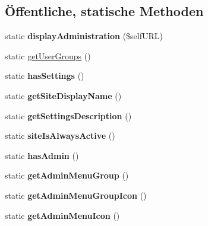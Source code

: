 \subsection*{Öffentliche, statische Methoden}
\begin{DoxyCompactItemize}
\item 
\mbox{\label{classadministrationusersync_a6d9513d9db627bb09eb7218b7edb7eb5}} 
static {\bfseries display\+Administration} (\$self\+U\+RL)
\item 
static \mbox{\hyperlink{classadministrationusersync_a017621e1115c3d33fb2b433400b42375}{get\+User\+Groups}} ()
\item 
\mbox{\label{classadministrationusersync_a8850e9d4ba31f89b3030b447663b54cb}} 
static {\bfseries has\+Settings} ()
\item 
\mbox{\label{classadministrationusersync_a7880adcbd68e55cc525f17a6b8c14ae4}} 
static {\bfseries get\+Site\+Display\+Name} ()
\item 
\mbox{\label{classadministrationusersync_add367634f95ac4630d45044b54bc7da7}} 
static {\bfseries get\+Settings\+Description} ()
\item 
\mbox{\label{classadministrationusersync_aa9dffff07c4e5b085f841b10195e3875}} 
static {\bfseries site\+Is\+Always\+Active} ()
\item 
\mbox{\label{classadministrationusersync_a7fd78c8cad878bc8c569ee752c65e1c3}} 
static {\bfseries has\+Admin} ()
\item 
\mbox{\label{classadministrationusersync_aebfc6086a490428b7830d8710eea0065}} 
static {\bfseries get\+Admin\+Menu\+Group} ()
\item 
\mbox{\label{classadministrationusersync_aa66871e4c4ba7b37e82d7bdfbc189736}} 
static {\bfseries get\+Admin\+Menu\+Group\+Icon} ()
\item 
\mbox{\label{classadministrationusersync_a065e1658e81e429163cc244e921f4669}} 
static {\bfseries get\+Admin\+Menu\+Icon} ()
\end{DoxyCompactItemize}
